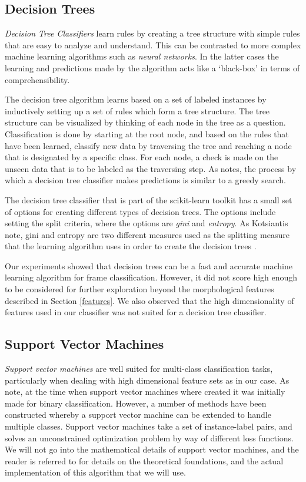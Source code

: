 \subsection{Decision Trees}

\textit{Decision Tree Classifiers} learn rules by creating a tree structure with simple rules that are easy to analyze and understand. This can be contrasted to more complex machine learning algorithms such as \textit{neural networks}. In the latter cases the learning and predictions made by the algorithm acts like a `black-box' in terms of comprehensibility.

The decision tree algorithm learns based on a set of labeled instances by inductively setting up a set of rules which form a tree structure. The tree structure can be visualized by thinking of each node in the tree as a question. Classification is done by starting at the root node, and based on the rules that have been learned, classify new data by traversing the tree and reaching a node that is designated by a specific class. For each node, a check is made on the unseen data that is to be labeled as the traversing step. As  notes, the process by which a decision tree classifier makes predictions is similar to a greedy search.

The decision tree classifier that is part of the scikit-learn toolkit has a small set of options for creating different types of decision trees. The options include setting the split criteria, where the options are \textit{gini} and \textit{entropy}. As Kotsiantis note, gini and entropy are two different measures used as the splitting measure that the learning algorithm uses in order to create the decision trees \cite{Kotsiantis:13}.

Our experiments showed that decision trees can be a fast and accurate machine learning algorithm for frame classification. However, it did not score high enough to be considered for further exploration beyond the morphological features described in Section \ref{features}. We also observed that the high dimensionality of features used in our classifier was not suited for a decision tree classifier.

\subsection{Support Vector Machines}

\textit{Support vector machines} are well suited for multi-class classification tasks, particularly when dealing with high dimensional feature sets as in our case. As  note, at the time when support vector machines where created it was initially made for binary classification. However, a number of methods have been constructed whereby a support vector machine can be extended to handle multiple classes. Support vector machines take a set of instance-label pairs, and solves an unconstrained optimization problem by way of different loss functions. We will not go into the mathematical details of support vector machines, and the reader is referred to \cite{liblinear} for details on the theoretical foundations, and the actual implementation of this algorithm that we will use.

